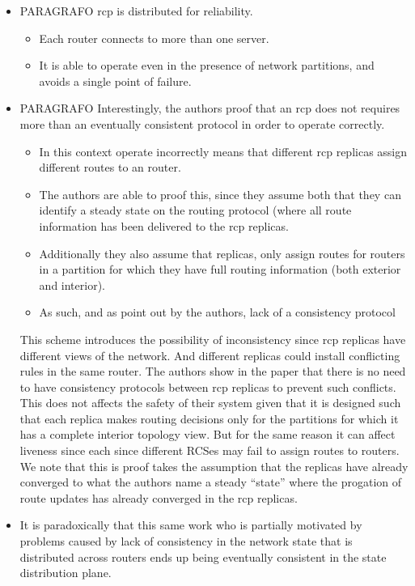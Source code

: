 \begin{itemize}
\item PARAGRAFO \gls{rcp} is distributed for reliability. 
  \begin{itemize}
  \item Each router connects to more than one server. 
  \item It is able to operate even in the presence of network partitions, and avoids a single point of failure. 
  \end{itemize}

\item PARAGRAFO Interestingly, the authors proof that an \gls{rcp} does not requires more than an eventually consistent protocol in order to operate correctly. 
  \begin{itemize}
  \item In this context operate incorrectly means that different \gls{rcp} replicas assign different routes to an router.
  \item The authors are able to proof this, since they assume both that they can identify a steady state on the routing protocol (where all route information has been delivered to the \gls{rcp} replicas. 
\item Additionally they also assume that replicas, only assign routes  for routers in a partition for which they have full routing information (both exterior and interior). 
\item As such, and as point out by the authors, lack of a consistency protocol 
  \end{itemize}

This scheme introduces the possibility of inconsistency since  \gls{rcp} replicas have different views of the network. 
And different replicas could install conflicting rules in the same router. 
The authors show in the paper that there is no need to have consistency protocols between \gls{rcp} replicas to prevent such conflicts. 
This does not affects the safety of their system given that it is designed such that each replica makes routing decisions only for the partitions for which it has a complete interior topology view. But for the same reason it can affect liveness since each since different RCSes may fail to assign routes to routers. 
We note that this is proof takes the assumption that the replicas have already converged to what the authors name a steady ``state''  where the progation of route updates has already converged in the \gls{rcp} replicas. 

\item It is paradoxically that this same work who is partially motivated by problems caused by lack of consistency in the network state that is distributed across routers ends up being eventually consistent in the state distribution plane. 
\end{itemize}

